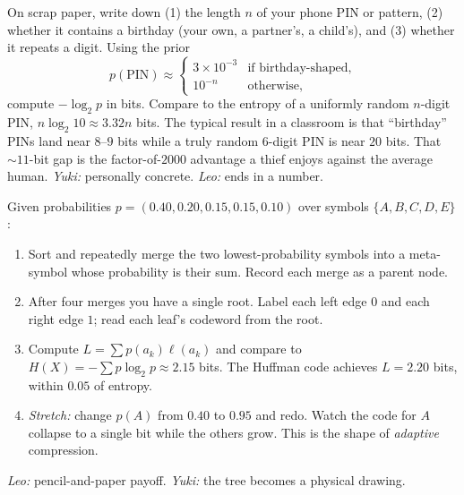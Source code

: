 \begin{activity}
\label{act:pin}
On scrap paper, write down (1) the length $n$ of your phone PIN or
pattern, (2) whether it contains a birthday (your own, a partner's,
a child's), and (3) whether it repeats a digit. Using the prior
\[
  p(\text{PIN}) \approx
  \begin{cases}
    3\times 10^{-3} & \text{if birthday-shaped}, \\
    10^{-n}          & \text{otherwise},
  \end{cases}
\]
compute $-\log_2 p$ in bits. Compare to the entropy of a uniformly
random $n$-digit PIN, $n \log_2 10 \approx 3.32 n$ bits. The typical
result in a classroom is that ``birthday'' PINs land near $8$--$9$
bits while a truly random 6-digit PIN is near $20$ bits. That
$\sim 11$-bit gap is the factor-of-$2000$ advantage a thief enjoys
against the average human.
\textit{Yuki:} personally concrete. \textit{Leo:} ends in a number.
\end{activity}

\begin{activity}
\label{act:huffman}
Given probabilities $p = (0.40, 0.20, 0.15, 0.15, 0.10)$ over
symbols $\{A,B,C,D,E\}$:
\begin{enumerate}[leftmargin=2em,itemsep=1pt]
  \item Sort and repeatedly merge the two lowest-probability symbols
    into a meta-symbol whose probability is their sum. Record each
    merge as a parent node.
  \item After four merges you have a single root. Label each left
    edge $0$ and each right edge $1$; read each leaf's codeword
    from the root.
  \item Compute $L = \sum p(a_k) \ell(a_k)$ and compare to
    $H(X) = -\sum p \log_2 p \approx 2.15$ bits. The Huffman code
    achieves $L = 2.20$ bits, within $0.05$ of entropy.
  \item \textit{Stretch:} change $p(A)$ from $0.40$ to $0.95$ and
    redo. Watch the code for $A$ collapse to a single bit while the
    others grow. This is the shape of \emph{adaptive} compression.
\end{enumerate}
\textit{Leo:} pencil-and-paper payoff. \textit{Yuki:} the tree
becomes a physical drawing.
\end{activity}

